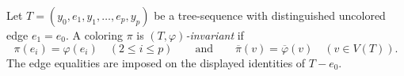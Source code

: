 \begin{definition}
Let $T=(y_0,e_1,y_1,\ldots,e_p,y_p)$ be a tree-sequence with
distinguished uncolored edge $e_1=e_0$.  A coloring $\pi$ is
\emph{$(T,\varphi)$-invariant} if
\[
 \pi(e_i)=\varphi(e_i)\quad(2\leq i\leq p)
 \qquad\text{and}\qquad
 \overline\pi(v)=\overline\varphi(v)\quad(v\in V(T)).
\]
The edge equalities are imposed on the displayed identities of $T-e_0$.
\end{definition}
